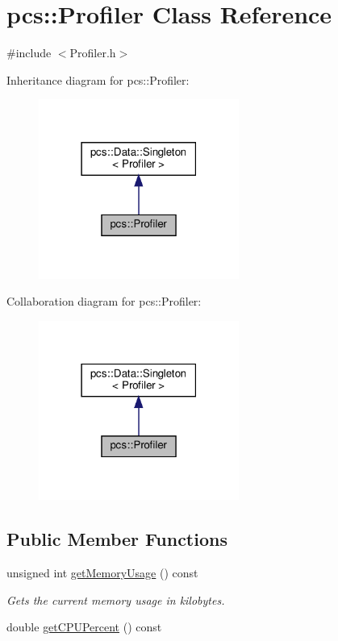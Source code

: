\hypertarget{classpcs_1_1Profiler}{}\section{pcs\+:\+:Profiler Class Reference}
\label{classpcs_1_1Profiler}


{\ttfamily \#include $<$Profiler.\+h$>$}



Inheritance diagram for pcs\+:\+:Profiler\+:
\nopagebreak
\begin{figure}[H]
\begin{center}
\leavevmode
\includegraphics[width=186pt]{classpcs_1_1Profiler__inherit__graph}
\end{center}
\end{figure}


Collaboration diagram for pcs\+:\+:Profiler\+:
\nopagebreak
\begin{figure}[H]
\begin{center}
\leavevmode
\includegraphics[width=186pt]{classpcs_1_1Profiler__coll__graph}
\end{center}
\end{figure}
\subsection*{Public Member Functions}
\begin{DoxyCompactItemize}
\item 
unsigned int \hyperlink{classpcs_1_1Profiler_a9e70423b9ea7b9434258aaba14082d90}{get\+Memory\+Usage} () const
\begin{DoxyCompactList}\small\item\em Gets the current memory usage in kilobytes. \end{DoxyCompactList}\item 
double \hyperlink{classpcs_1_1Profiler_a79c7f10f296aa9679ba3698b8f30e87e}{get\+C\+P\+U\+Percent} () const
\end{DoxyCompactItemize}
